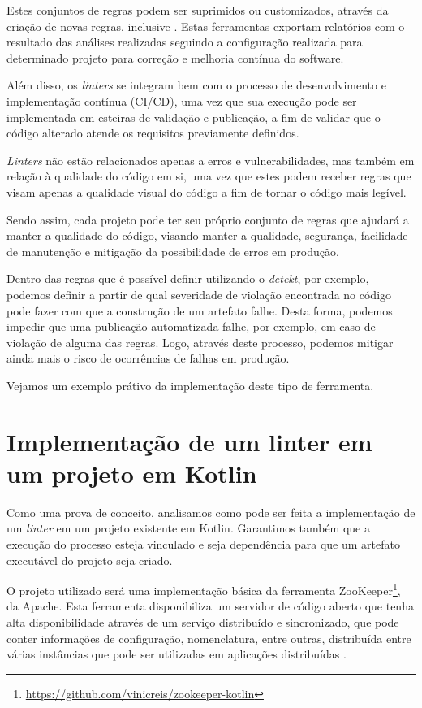 Estes conjuntos de regras podem ser suprimidos ou customizados, através da criação de novas regras, inclusive \cite{detekt_config}. Estas ferramentas exportam relatórios com o resultado das análises realizadas seguindo a configuração realizada para determinado projeto para correção e melhoria contínua do software.

Além disso, os \textit{linters} se integram bem com o processo de desenvolvimento e implementação contínua (CI/CD), uma vez que sua execução pode ser implementada em esteiras de validação e publicação, a fim de validar que o código alterado atende os requisitos previamente definidos.

\textit{Linters} não estão relacionados apenas a erros e vulnerabilidades, mas também em relação à qualidade do código em si, uma vez que estes podem receber regras que visam apenas a qualidade visual do código a fim de tornar o código mais legível.

Sendo assim, cada projeto pode ter seu próprio conjunto de regras que ajudará a manter a qualidade do código, visando manter a qualidade, segurança, facilidade de manutenção e mitigação da possibilidade de erros em produção.

Dentro das regras que é possível definir utilizando o \textit{detekt}, por exemplo, podemos definir a partir de qual severidade de violação encontrada no código pode fazer com que a construção de um artefato falhe. Desta forma, podemos impedir que uma publicação automatizada falhe, por exemplo, em caso de violação de alguma das regras. Logo, através deste processo, podemos mitigar ainda mais o risco de ocorrências de falhas em produção.

Vejamos um exemplo prátivo da implementação deste tipo de ferramenta.

\section{Implementação de um linter em um projeto em Kotlin}\label{sec:linter_implementation}

Como uma prova de conceito, analisamos como pode ser feita a implementação de um \textit{linter} em um projeto existente em Kotlin. Garantimos também que a execução do processo esteja vinculado e seja dependência para que um artefato executável do projeto seja criado.

O projeto utilizado será uma implementação básica da ferramenta ZooKeeper\footnote{\url{https://github.com/vinicreis/zookeeper-kotlin}}, da Apache. Esta ferramenta disponibiliza um servidor de código aberto que tenha alta disponibilidade através de um serviço distribuído e sincronizado, que pode conter informações de configuração, nomenclatura, entre outras, distribuída entre várias instâncias que pode ser utilizadas em aplicações distribuídas \cite{apache_zookeeper_home}.


